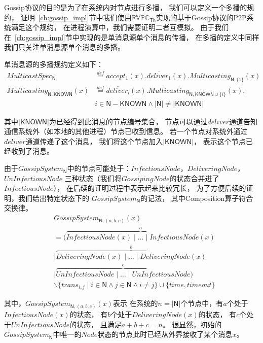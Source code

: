 Gossip协议的目的是为了在系统内对节点进行多播，
我们可以定义一个多播的规约，
证明~\ref{ch:gossip_impl}节中我们使用$\mathbb{RVPC}_{\mathsf{Th}}$实现的基于Gossip协议的P2P系统满足这个规约，
在进程演算中，我们需要证明二者互模拟。
由于我们在~\ref{ch:gossip_impl}节中实现的是单消息源单个消息的传播，
在多播的定义中同样我们只关注单消息源单个消息的多播。
\begin{definition} 单消息源的多播规约定义如下：
\begin{align*} 
    MulticastSpec_\mathsf{N}&\stackrel{def}{=}accept_1(x).\overline{deliver_1}(x).Multicasting_{\mathsf{N},\{1\}}(x)\\
    Multicasting_{\mathsf{N},\mathsf{KNOWN}}(x)&\stackrel{def}{=}\overline{deliver_i}(x).Multicasting_{\mathsf{N},\mathsf{KNOWN}\cup\{i\}}(x), \\
    &i\in \mathsf{N}-\mathsf{KNOWN} \wedge |\mathsf{N}|\neq |\mathsf{KNOWN}|
 \end{align*}
\end{definition} 
其中$|\mathsf{KNOWN}|$为已经得到此消息的节点编号集合，
节点可以通过$deliver$通道告知通信系统外（如本地的其他进程）节点已收到信息。
若一个节点对系统外通过$deliver$通道传递了这个消息，
我们将这个节点加入$|\mathsf{KNOWN}|$，
表示这个节点已经收到了消息。

 \begin{definition} 
   由于$GossipSystem_{\mathsf{N}}$中的节点可能处于：$InfectiousNode$，$DeliveringNode$，$UnInfectiousNode$
   三种状态（我们将$GossipingNode$的状态合并进了$InfectiousNode$），
   在后续的证明过程中表示起来比较冗长，
   为了方便后续的证明，我们给出特定状态下的
   $GossipSystem_{\mathsf{N}}$的记法，
   其中Composition算子符合交换律。
    \begin{align*}
   &GossipSystem_{\mathsf{N},(a,b,c)}(x)\\
   &= (\stackrel{a}{\overbrace{InfectiousNode(x)\mid \dots \mid InfectiousNode(x)}}\\
   &\mid \stackrel{b}{\overbrace{DeliveringNode(x)\mid \dots\mid DeliveringNode(x)}}\\
   &\mid \stackrel{c}{\overbrace{UnInfectiousNode\mid \dots \mid UnInfectiousNode}})\\
   &\backslash \{trans_{i,j}\mid i\in \mathsf{N} \wedge j\in \mathsf{N} \wedge i\neq j\}\cup \{time, timeout\}
\end{align*}
 \end{definition}
 其中，$GossipSystem_{\mathsf{N},(a,b,c)}(x)$表示
 在系统的$n=|\mathsf{N}|$个节点中，有$a$个处于$InfectiousNode(x)$的状态，
 有$b$个处于$DeliveringNode(x)$的状态，
 有$c$个处于$UnInfectiousNode$的状态，
 且满足$a+b+c=n$。
 很显然，初始的$GossipSystem_{\mathsf{N}}$中唯一的$Node$状态的节点此时已经从外界接收了某个消息$x$。

